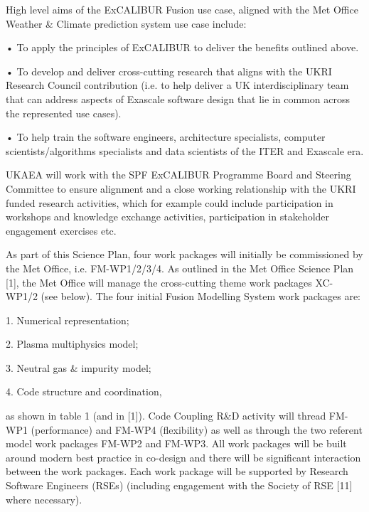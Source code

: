 \documentclass{article}
\begin{document}
\vspace{24pt}
High level aims of the ExCALIBUR Fusion use case, aligned with the Met Office Weather 
\& Climate prediction system use case include:

\vspace{24pt}
\leftskip=0pt
• To apply the principles of ExCALIBUR to deliver the benefits outlined above.

\vspace{12pt}
• To develop and deliver cross-cutting research that aligns with the UKRI Research 
Council contribution (i.e. to help deliver a UK interdisciplinary team that can 
address aspects of Exascale software design that lie in common across the represented 
use cases).

\vspace{12pt}
• To help train the software engineers, architecture specialists, computer scientists/algorithms 
specialists and data scientists of the ITER and Exascale era.

\vspace{24pt}
\leftskip=-14pt
UKAEA will work with the SPF ExCALIBUR Programme Board and Steering Committee to 
ensure alignment and a close working relationship with the UKRI funded research 
activities, which for example could include participation in workshops and knowledge 
exchange activities, participation in stakeholder engagement exercises etc.

\vspace{24pt}
As part of this Science Plan, four work packages will initially be commissioned 
by the Met Office, i.e. FM-WP1/2/3/4. As outlined in the Met Office Science Plan 
[1], the Met Office will manage the cross-cutting theme work packages XC-WP1/2 
(see below). The four initial Fusion Modelling System work packages are:

\vspace{24pt}
\leftskip=0pt
1. Numerical representation;

\vspace{12pt}
2. Plasma multiphysics model;

\vspace{12pt}
3. Neutral gas \& impurity model;

\vspace{12pt}
4. Code structure and coordination,

\vspace{24pt}
\leftskip=-14pt
as shown in table 1 (and in [1]). Code Coupling R\&D activity will thread FM-WP1 
(performance) and FM-WP4 (flexibility) as well as through the two referent model 
work packages FM-WP2 and FM-WP3. All work packages will be built around modern 
best practice in co-design and there will be significant interaction between the 
work packages. Each work package will {\color{color29} be supported by Research 
Software Engineers (RSEs) (including engagement with the Society of RSE [11]} where 
necessary).
\end{document}
